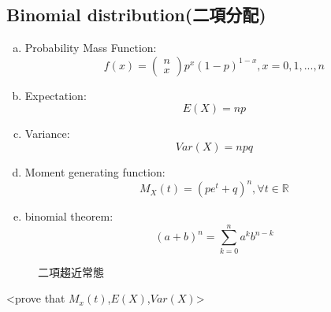 \documentclass[12pt, a4paper]{article}
\begin{document}
\subsection{Binomial distribution(二項分配)}
\begin{enumerate}[a)]
\item Probability Mass Function:$$f(x)=\left(\begin{array}{c}n\\ x\end{array}\right)p^{x}(1-p)^{1-x},x=0,1,...,n$$
\item Expectation:$$E(X)=np$$
\item Variance:$$Var(X)=npq$$
\item Moment generating function:$$M_{X}(t)=(pe^{t}+q)^n,\forall t\in \mathbb{R}$$
\item binomial theorem:$$(a+b)^n=\sum_{k=0}^na^kb^{n-k}$$
\end{enumerate}
\begin{figure}[h]
    \caption{二項趨近常態}
    \label{fig:binnor}
\end{figure}
<prove that $M_{x}(t)$,$E(X)$,$Var(X)$>
\end{document}
